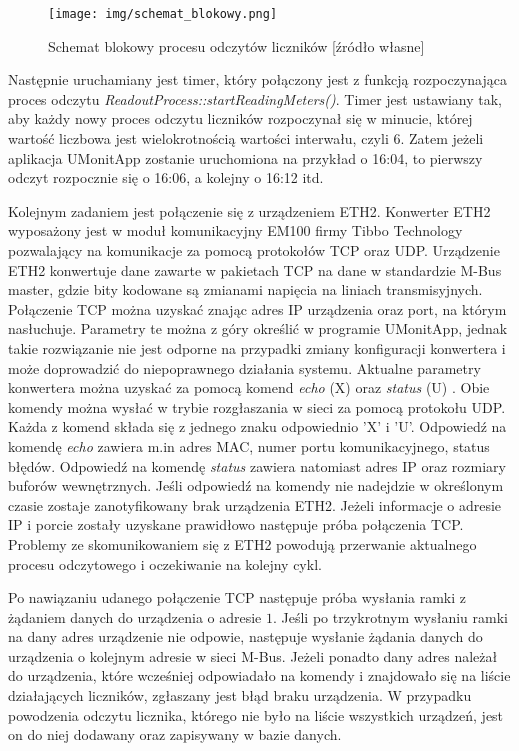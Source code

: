 \begin{figure}[H]
	\centering
	\texttt{[image: img/schemat\_blokowy.png]}
	\caption[Schemat blokowy procesu odczytów liczników]{Schemat blokowy procesu odczytów liczników [źródło własne]}
	\label{fig:flowchart}
\end{figure}

Następnie uruchamiany jest timer, który połączony jest z funkcją rozpoczynająca proces odczytu \textit{ReadoutProcess::startReadingMeters()}.
Timer jest ustawiany tak, aby każdy nowy proces odczytu liczników rozpoczynał się w minucie, której wartość liczbowa jest wielokrotnością wartości interwału, czyli $ 6$.
Zatem jeżeli aplikacja UMonitApp zostanie uruchomiona na przykład o 16:04, to pierwszy odczyt rozpocznie się o 16:06, a kolejny o 16:12 itd.

Kolejnym zadaniem jest połączenie się z urządzeniem ETH2.
Konwerter ETH2 wyposażony jest w moduł komunikacyjny EM100 firmy Tibbo Technology pozwalający na komunikacje za pomocą protokołów TCP oraz UDP.
Urządzenie ETH2 konwertuje dane zawarte w pakietach TCP na dane w standardzie M-Bus master, gdzie bity kodowane są zmianami napięcia na liniach transmisyjnych.
Połączenie TCP można uzyskać znając adres IP urządzenia oraz port, na którym nasłuchuje.
Parametry te można z góry określić w programie UMonitApp, jednak takie rozwiązanie nie jest odporne na przypadki zmiany konfiguracji konwertera i może doprowadzić do niepoprawnego działania systemu.
Aktualne parametry konwertera można uzyskać za pomocą komend \textit{echo} (X) \cite{tibbo_x} oraz \textit{status} (U) \cite{tibbo_u}.
Obie komendy można wysłać w trybie rozgłaszania w sieci za pomocą protokołu UDP.
Każda z komend składa się z jednego znaku odpowiednio 'X' i 'U'.
Odpowiedź na komendę \textit{echo} zawiera m.in adres MAC, numer portu komunikacyjnego, status błędów.
Odpowiedź na komendę \textit{status} zawiera natomiast adres IP oraz rozmiary buforów wewnętrznych.
Jeśli odpowiedź na komendy nie nadejdzie w określonym czasie zostaje zanotyfikowany brak urządzenia ETH2.
Jeżeli informacje o adresie IP i porcie zostały uzyskane prawidłowo następuje próba połączenia TCP.
Problemy ze skomunikowaniem się z ETH2 powodują przerwanie aktualnego procesu odczytowego i oczekiwanie na kolejny cykl.

Po nawiązaniu udanego połączenie TCP następuje próba wysłania ramki z żądaniem danych do urządzenia o adresie $ 1 $.
Jeśli po trzykrotnym wysłaniu ramki na dany adres urządzenie nie odpowie, następuje wysłanie żądania danych do urządzenia o kolejnym adresie w sieci M-Bus.
Jeżeli ponadto dany adres należał do urządzenia, które wcześniej odpowiadało na komendy i znajdowało się na liście działających liczników, zgłaszany jest błąd braku urządzenia.
W przypadku powodzenia odczytu licznika, którego nie było na liście wszystkich urządzeń, jest on do niej dodawany oraz zapisywany w bazie danych.

